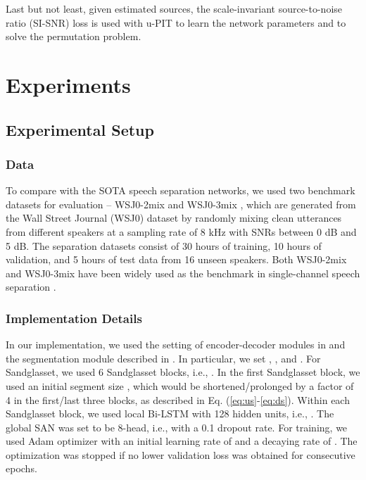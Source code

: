 \documentclass{article}
\begin{document}
Last but not least, given  estimated sources, the scale-invariant source-to-noise ratio (SI-SNR) loss \cite{luo2018tasnet} is used with u-PIT \cite{yu2017permutation} to learn the network parameters and to solve the permutation problem.

\section{Experiments}
\label{sec:4}
\subsection{Experimental Setup}
\subsubsection{Data}
To compare with the SOTA speech separation networks, we used two benchmark datasets for evaluation -- WSJ0-2mix and WSJ0-3mix \cite{hershey2016deep}, which are generated from the Wall Street
Journal (WSJ0) \cite{garofalocontinuous} dataset by randomly mixing clean utterances from different speakers at a sampling rate of 8 kHz with SNRs between 0 dB and 5 dB. The separation datasets consist of 30 hours of training, 10 hours of validation, and 5 hours of test data from 16 unseen speakers. Both WSJ0-2mix and WSJ0-3mix have been widely used as the benchmark in single-channel speech separation \cite{luo2019dual, liu2019divide, luo2018tasnet, luo2019conv, wang2018end, zhang2020furcanext, lam2020mixup}. 

\subsubsection{Implementation Details}
In our implementation, we used the setting of encoder-decoder modules in \cite{luo2018tasnet, luo2019conv} and the segmentation module described in \cite{luo2019dual}. In particular, we set , , and . For Sandglasset, we used 6 Sandglasset blocks, i.e., . In the first Sandglasset block, we used an initial segment size , which would be shortened/prolonged by a factor of 4 in the first/last three blocks, as described in Eq. (\ref{eq:us}-\ref{eq:ds}). Within each Sandglasset block, we used local Bi-LSTM with 128 hidden units, i.e., . The global SAN was set to be 8-head, i.e.,  with a 0.1 dropout rate. For training, we used Adam \cite{kingma2014adam} optimizer with an initial learning rate of  and a decaying rate of . The optimization was stopped if no lower validation loss was obtained for  consecutive epochs.
\end{document}
